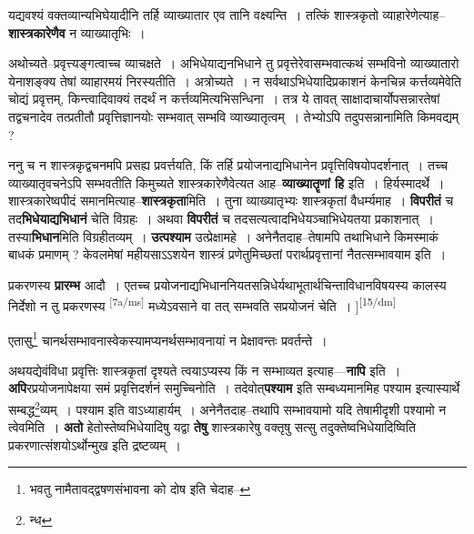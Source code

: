 \documentclass[article,12pt,a4paper]{memoir}
\begin{document}
	  \pstart यद्यवश्यं वक्तव्यान्यभिघेयादीनि तर्हि व्याख्यातार एव तानि वक्ष्यन्ति । तत्किं शास्त्रकृतो व्याहारेणेत्याह--\textbf{शास्त्रकारेणैव} न व्याख्यातृभिः ।
	\pend
      

	  \pstart अथोच्यते--प्रवृत्त्यङ्गत्वाच्च व्याचक्षते । अभिधेयाद्यनभिधाने तु प्रवृत्तेरेवासम्भवात्कथं सम्भविनो व्याख्यातारो येनाशङ्क्य तेषां व्याहारमयं निरस्यतीति । अत्रोच्यते । न सर्वथाऽभिधेयादिप्रकाशनं केनचिन्न कर्त्तव्यमेवेति चोद्यं प्रवृत्तम्, किन्त्वादिवाक्यं तदर्थं न कर्त्तव्यमित्यभिसन्धिना । तत्र ये तावत् साक्षादाचार्योपसन्नारतेषां तद्वचनादेव तत्प्रतीतौ प्रवृत्तिज्ञानयोः सम्भवात् सम्भवि व्याख्यातृत्वम् । तेभ्योऽपि तदुपसन्नानामिति किमवद्यम् ?
	\pend
      

	  \pstart ननु च न शास्त्रकृद्वचनमपि प्रसह्य प्रवर्त्तयति, किं तर्हि प्रयोजनाद्यभिधानेन प्रवृत्तिविषयोपदर्शनात् । तच्च व्याख्यातृवचनेऽपि सम्भवतीति किमुच्यते शास्त्रकारेणैवेत्यत आह--\textbf{व्याख्यातॄणां हि} इति । हिर्यस्मादर्थे । शास्त्रकारेष्वपीदं समानमित्याह--\textbf{शास्त्रकृता}मिति । तुना व्याख्यातृभ्यः शास्त्रकृतां वैधर्म्यमाह । \textbf{विपरीतं} च तद\textbf{भिधेयाद्यभिधानं} चेति विग्रहः । अथवा \textbf{विपरीतं} च तदसत्यत्वादभिधेयञ्चाभिधेयतया प्रकाशनात् । तस्या\textbf{भिधान}मिति विग्रहीतव्यम् । \textbf{उत्पश्याम} उत्प्रेक्षामहे । अनेनैतदाह--तेषामपि तथाभिधाने किमस्माकं बाधकं प्रमाणम् ? केवलमेषां महीयसाऽऽशयेन शास्त्रं प्रणेतुमिच्छतां परार्थप्रवृत्तानां नैतत्सम्भावयाम इति ।
	\pend
      

	  \pstart प्रकरणस्य \textbf{प्रारम्भ} आदौ । एतच्च प्रयोजनाद्यभिधाननियतसन्निधेर्यथाभूतार्थचिन्ताविधानविषयस्य कालस्य निर्देशो न तु प्रकरणस्य \leavevmode\textsuperscript{\rmlatinfont\tiny [7a/ms]} मध्येऽवसाने वा तत् सम्भवति सप्रयोजनं चेति ।
	\pend
      [[उपायोऽस्ति प्रयो० C]]\leavevmode\textsuperscript{\rmlatinfont\tiny [15/dm]}

	  \pstart एतासु\footnote{भवतु नामैतावद्द्वषणसंभावना को दोष इति चेदाह--\cite{dp-msD-n}} चानर्थसम्भावनास्वेकस्यामप्यनर्थसम्भावनायां न प्रेक्षावन्तः प्रवर्तन्ते ।
	\pend
      

	  \pstart अथयद्येवंविधा प्रवृत्तिः शास्त्रकृतां दृश्यते त्वयाऽप्यस्य किं न सम्भाव्यत इत्याह—\textbf{नापि} इति । \textbf{अपि}रप्रयोजनापेक्षया समं प्रवृत्तिदर्शनं समुच्चिनोति । तदेवोत्\textbf{पश्याम} इति सम्बध्यमानमिह पश्याम इत्यास्यार्थे सम्बद्ध\footnote{न्ध}व्यम् । पश्याम इति वाऽध्याहार्यम् । अनेनैतदाह--तथापि सम्भावयामो यदि तेषामीदृशी पश्यामो न त्वेवमिति । \textbf{अतो} हेतोस्तेष्वभिधेयादिषु यद्वा \textbf{तेषु} शास्त्रकारेषु वक्तृषु सत्सु तदुक्तेष्वभिधेयादिष्विति प्रकरणात्संशयोऽर्थोन्मुख इति द्रष्टव्यम् ।
	\pend
      
\end{document}
